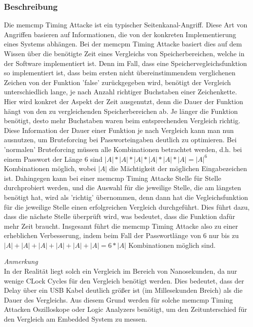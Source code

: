 \documentclass[a4paper,
DIV=13,
12pt,
BCOR=10mm,
department=FakIM,
oneside,
parskip=half,
automark,
listof=totocnumbered,
bibliography=totocnumbered,
acronym=totocnumbered
] {OTHRartcl}
\begin{document}
\subsubsection{Beschreibung}
Die memcmp Timing Attacke ist ein typischer Seitenkanal-Angriff. Diese Art von Angriffen basieren auf Informationen, die von der konkreten Implementierung eines Systems abhängen.
Bei der memcpm Timing Attacke basiert dies auf dem Wissen über die benötigte Zeit eines Vergleichs von Speicherbereichen, welche in der Software implementiert ist.
Denn im Fall, dass eine Speichervegleichsfunktion so implementiert ist, dass beim ersten nicht übereinstimmendem verglichenen Zeichen von der Funktion 'false' zurückgegeben wird,
benötigt der Vergleich unterschiedlich lange, je nach Anzahl richtiger Buchstaben einer Zeichenkette.
Hier wird konkret der Aspekt der Zeit ausgenutzt, denn die Dauer der Funktion hängt von den zu vergleichenden Speicherbereichen ab.
Je länger die Funktion benötigt, desto mehr Buchstaben waren beim entsprechenden Vergleich richtig.
Diese Information der Dauer einer Funktion je nach Vergleich kann man nun ausnutzen, um Bruteforcing bei Passworteingaben deutlich zu optimieren.
Bei 'normalen' Bruteforcing müssen alle Kombinationen betrachtet werden, d.h.
bei einem Passwort der Länge 6 sind $|A|*|A|*|A|*|A|*|A|*|A| = |A|^6$ Kombinationen möglich, wobei $|A|$ die Mächtigkeit der möglichen Eingabezeichen ist.
Dahingegen kann bei einer memcmp Timing Attacke Stelle für Stelle durchprobiert werden, und die Auswahl für die jeweilige Stelle, die am längsten benötigt hat,
wird als 'richtig' übernommen, denn dann hat die Vegleichsfunktion für die jeweilige Stelle einen erfolgreichen Vergleich durchgeführt.
Dies führt dazu, dass die nächste Stelle überprüft wird, was bedeutet, dass die Funktion dafür mehr Zeit braucht.
Insgesamt führt die memcmp Timing Attacke also zu einer erheblichen Verbesserung, indem beim Fall der Passwortlänge von 6
nur bis zu $ |A|+|A|+|A|+|A|+|A|+|A| = 6 * |A| $ Kombinationen möglich sind.

\textit{Anmerkung} \mbox{} \\
In der Realität liegt solch ein Vergleich im Bereich von Nanosekunden, da nur wenige CLock Cycles für den Vergleich benötigt werden.
Dies bedeutet, dass der Delay über ein USB Kabel deutlich größer ist (im Millesekunden Breich) als die Dauer des Vergleichs.
Aus diesem Grund werden für solche memcmp Timing Attacken Oszilloskope oder Logic Analyzers benötigt, um den Zeitunterschied
für den Vergleich am Embedded System zu messen.
\end{document}
